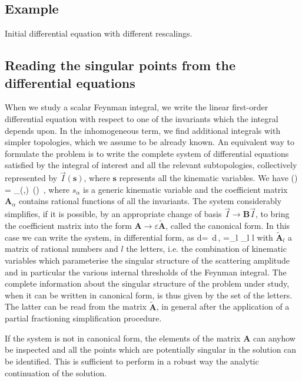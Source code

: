 \subsection{Example}
Initial differential equation with different rescalings.



\subsection{Reading the singular points from the differential equations}
\label{sec:reading}
When we study a scalar Feynman integral,
we write the linear first-order differential equation
with respect to one of the invariants
which the integral depends upon.
In the inhomogeneous term, we find additional integrals with simpler topologies,
which we assume to be already known.
An equivalent way to formulate the problem is
to write the complete system of differential equations satisfied
by the integral of interest and all the relevant subtopologies,
collectively represented by $\vec{I}(\mathbf{s})$, where  $\mathbf{s}$
represents all the kinematic variables. We have
\be
{} ()
= _\alpha(\varepsilon,)\, ()\, ,
\ee
where $s_\alpha$ is a generic kinematic variable and
the coefficient matrix $\mathbf{A}_\alpha$ contains rational functions of
all the invariants.
The system considerably simplifies, if it is possible,
by an appropriate change of basis $\vec{I}\to \mathbf{B}\vec{I}$,
to bring the coefficient matrix into the form
$\mathbf{A}\to\varepsilon \mathbf{\tilde A}$, called the canonical form.
In this case we can write the system, in differential form, as
\be
d=\varepsilon\, d\,,\quad\quad
{}=\sum_l _l \log l
\ee
with $\mathbf{\tilde A}_l$ a matrix of rational numbers and $l$ the letters,
i.e. the combination of kinematic variables
which parameterise the singular structure of the scattering amplitude
and in particular the various internal thresholds of the Feynman integral.
The complete information
about the singular structure of the problem under study,
when it can be written in canonical form,
is thus given by the set of the letters.
The latter can be read from the matrix $\mathbf{\tilde A}$,
in general after the application of
a partial fractioning simplification procedure.

If the system is not in canonical form,
the elements of the matrix $\mathbf{A}$ can anyhow be inspected
and all the points which are potentially singular in the solution
can be identified.
This is sufficient to perform in a robust way
the analytic continuation of the solution.


